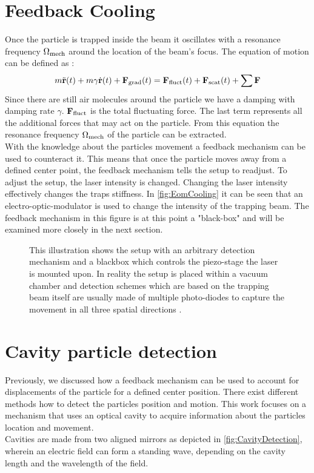\section{Feedback Cooling}
Once the particle is trapped inside the beam it oscillates with a resonance frequency $\de{\Omega}{mech}$ around the location of the beam's focus. The equation of motion can be defined as \cite[p.~24]{hebestreit2017thermal}:
\begin{equation}
	m\ddot{\vc{r}}(t)+m\gamma\dot{\vc{r}}(t)+\field{F}{grad}(t)=\field{F}{fluct}(t)+\field{F}{scat}(t)+\sum\limits\vc{F}
\end{equation}
Since there are still air molecules around the particle we have a damping with damping rate $\gamma$. $\field{F}{fluct}$ is the total fluctuating force. The last term represents all the additional forces that may act on the particle. From this equation the resonance frequency $\de{\Omega}{mech}$ of the particle can be extracted.\\
With the knowledge about the particles movement a feedback mechanism can be used to counteract it. This means that once the particle moves away from a defined center point, the feedback mechanism tells the setup to readjust. To adjust the setup, the laser intensity is changed. Changing the laser intensity effectively changes the traps stiffness. In \autoref{fig:EomCooling} it can be seen that an electro-optic-modulator is used to change the intensity of the trapping beam. The feedback mechanism in this figure is at this point a "black-box" and will be examined more closely in the next section.
\begin{figure}[H]
    
    \caption{This illustration shows the setup with an arbitrary detection mechanism and a blackbox which controls the piezo-stage the laser is mounted upon. In reality the setup is placed within a vacuum chamber and detection schemes which are based on the trapping beam itself are usually made of multiple photo-diodes to capture the movement in all three spatial directions \cite[p.~43]{hebestreit2017thermal}.}
    \label{fig:EomCooling}
\end{figure}

\section{Cavity particle detection}\label{ChapCavityDetection}
Previously, we discussed how a feedback mechanism can be used to account for displacements of the particle for a defined center position. There exist different methods how to detect the particles position and motion. This work focuses on a mechanism that uses an optical cavity to acquire information about the particles location and movement.\\
Cavities are made from two aligned mirrors as depicted in \autoref{fig:CavityDetection}, wherein an electric field can form a standing wave, depending on the cavity length and the wavelength of the field.

